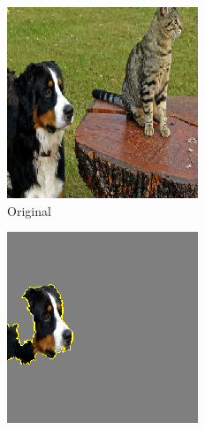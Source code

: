 \begin{figure}[ht]
  \centering
  \begin{subfigure}{0.32\linewidth}
    \includegraphics[width=\linewidth]{figures/lime_orig.png}
    \caption{Original}
    \label{fig:bird-a}
  \end{subfigure}
  \begin{subfigure}{0.32\linewidth}
    \includegraphics[width=\linewidth]{figures/lime_dog_mask.png}

\end{subfigure}
\end{figure}
